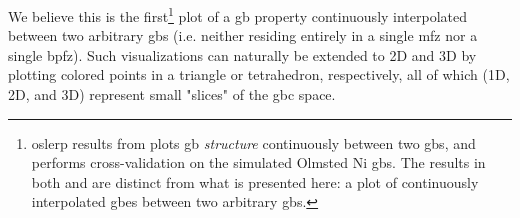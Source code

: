 \documentclass[final,twocolumn,12pt]{elsarticle}
\begin{document}
We believe this is the first\footnote{\Gls{oslerp} results from \cite{francisGeodesicOctonionMetric2019} plots \gls{gb} \emph{structure} continuously between two \glspl{gb}, and \cite{chesserLearningGrainBoundary2020} performs cross-validation on the simulated Olmsted Ni \glspl{gb}. The results in both \cite{francisGeodesicOctonionMetric2019} and \cite{chesserLearningGrainBoundary2020} are distinct from what is presented here: a plot of continuously interpolated \glspl{gbe} between two arbitrary \glspl{gb}.} plot of a \gls{gb} property continuously interpolated between two arbitrary \glspl{gb} (i.e. neither residing entirely in a single \gls{mfz} nor a single \gls{bpfz}). Such visualizations can naturally be extended to 2D and 3D by plotting colored points in a triangle or tetrahedron, respectively, all of which (1D, 2D, and 3D) represent small "slices" of the \gls{gbc} space. 
\end{document}
